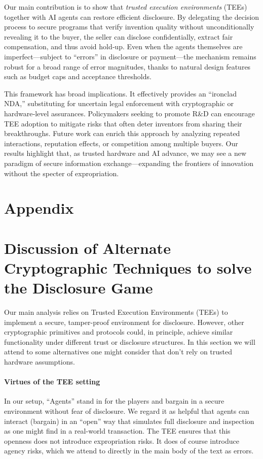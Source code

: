 \documentclass{article}
\begin{document}
Our main contribution is to show that \emph{trusted execution environments} (TEEs) together with AI agents can restore efficient disclosure. By delegating the decision process to secure programs that verify invention quality without unconditionally revealing it to the buyer, the seller can disclose confidentially, extract fair compensation, and thus avoid hold‐up. Even when the agents themselves are imperfect—subject to “errors” in disclosure or payment—the mechanism remains robust for a broad range of error magnitudes, thanks to natural design features such as budget caps and acceptance thresholds. 

This framework has broad implications. It effectively provides an “ironclad NDA,” substituting for uncertain legal enforcement with cryptographic or hardware‐level assurances. Policymakers seeking to promote R\&D can encourage TEE adoption to mitigate risks that often deter inventors from sharing their breakthroughs. Future work can enrich this approach by analyzing repeated interactions, reputation effects, or competition among multiple buyers. Our results highlight that, as trusted hardware and AI advance, we may see a new paradigm of secure information exchange—expanding the frontiers of innovation without the specter of expropriation.


\newpage
\appendix
\section*{Appendix}
\section{Discussion of Alternate Cryptographic Techniques to solve the Disclosure Game}\label{app:cryptography}
Our main analysis relies on Trusted Execution Environments (TEEs) to implement a secure, tamper-proof environment for disclosure. However, other cryptographic primitives and protocols could, in principle, achieve similar functionality under different trust or disclosure structures. In this section we will attend to some alternatives one might consider that don't rely on trusted hardware assumptions. 

\paragraph{Virtues of the TEE setting}
In our setup, ``Agents'' stand in for the players and bargain in a secure environment without fear of disclosure. We regard it as helpful that agents can interact (bargain) in an ``open'' way that simulates full disclosure and inspection as one might find in a real-world transaction. The TEE ensures that this openness does not introduce expropriation risks. It does of course introduce agency risks, which we attend to directly in the main body of the text as errors. 
\end{document}
